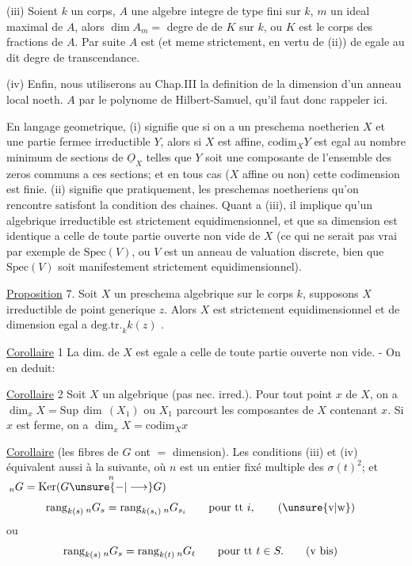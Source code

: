 (iii) Soient $k$ un corps, $A$ une algebre integre de type fini sur $k$,
$m$ un ideal maximal de $A$, alors $\dim A_m={}$ degre de  de $K$ sur
$k$, ou $K$ est le corps des fractions de $A$. Par suite $A$ est 
(et meme strictement, en vertu de (ii)) de  egale au dit
degre de transcendance.

(iv) Enfin, nous utiliserons au Chap.III la definition de la dimension
d'un anneau local noeth. $A$ par le  polynome de Hilbert-Samuel,
qu'il faut donc rappeler ici.

En langage geometrique, (i) signifie que si on a un preschema
 noetherien $X$ et une partie fermee irreductible $Y$,
alors si $X$ est affine, $\mathrm{codim}_X Y$ est egal au nombre minimum de sections
de $\underline O_X$ telles que $Y$ soit une composante de l'ensemble des zeros communs
a ces sections; et en tous cas ($X$ affine ou non) cette codimension est
finie. (ii) signifie que pratiquement, les preschemas noetheriens
qu'on rencontre satisfont la condition des chaines. Quant a (iii), il
implique qu'un  algebrique irreductible est strictement
equidimensionnel, et que sa dimension est identique a celle de
toute partie ouverte non vide de $X$ (ce qui ne serait pas vrai par
exemple de $\mathrm{Spec}(V)$, ou $V$ est un anneau de valuation discrete, bien
que $\mathrm{Spec}(V)$ soit manifestement strictement equidimensionnel). 

\uline{Proposition} 7. Soit $X$ un preschema algebrique sur le corps $k$, supposons
$X$ irreductible de point generique $z$. Alors $X$ est strictement equidimensionnel
et de dimension egal a $\mathrm{deg.tr.}_k k(z)$ .

\uline{Corollaire} 1 \quad La dim. de $X$ est egale a celle de toute partie ouverte
non vide. \qquad - \quad On en deduit:

\uline{Corollaire} 2 \quad Soit $X$ un  algebrique (pas nec. irred.). Pour
tout point  $x$ de $X$, on a $\dim_x X=\mathrm{Sup}\,\dim\,(X_1)$ ou $X_1$ parcourt les
composantes de $X$ contenant $x$. Si $x$ est ferme, on a $\dim_x X=\mathrm{codim}_X x$

\uline{Corollaire} (les fibres de $G$ ont $=$ dimension). Les conditions
(iii) et (iv) équivalent aussi à la suivante, où
$n$ est un entier fixé  multiple des $\sigma(t)^2$; et
$\,{}_nG=\mathrm{Ker}(G\overset n{\unsure{-|\longrightarrow}}G)$
\[
\operatorname{rang}_{k(s)}{}_nG_s=\operatorname{rang}_{k(s_i)}{}_nG_{s_i}\qquad\text{pour tt }i,\tag*{\textup{(\unsure{v|w})}\quad}
\]
ou
\[
\operatorname{rang}_{k(s)}{}_nG_s=\operatorname{rang}_{k(t)}{}_nG_t\qquad\text{pour tt }t\in S.\tag*{\textup{(v bis)}\quad}
\]

